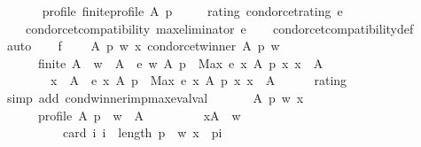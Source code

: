 \begin{isabellebody}
\ \ \isanewline
\ \ \ \ profile{\isacharcolon}{\kern0pt}\ {\isachardoublequoteopen}finite{\isacharunderscore}{\kern0pt}profile\ A\ p{\isachardoublequoteclose}\ \isanewline
\ \ \ \ rating{\isacharcolon}{\kern0pt}\ {\isachardoublequoteopen}condorcet{\isacharunderscore}{\kern0pt}rating\ e{\isachardoublequoteclose}\isanewline
\ \ \isanewline
\ \ \ \ {\isachardoublequoteopen}condorcet{\isacharunderscore}{\kern0pt}compatibility\ {\isacharparenleft}{\kern0pt}max{\isacharunderscore}{\kern0pt}eliminator\ e{\isacharparenright}{\kern0pt}{\isachardoublequoteclose}\isanewline
%
\isadelimproof
\ \ %
\endisadelimproof
%
\isatagproof
{}\isamarkupfalse%
\ condorcet{\isacharunderscore}{\kern0pt}compatibility{\isacharunderscore}{\kern0pt}def\isanewline
{}\isamarkupfalse%
\ {\isacharparenleft}{\kern0pt}auto{\isacharparenright}{\kern0pt}\isanewline
\ \ \isamarkupfalse%
\ f{}{\isacharcolon}{\kern0pt}\isanewline
\ \ \ \ {\isachardoublequoteopen}{\isasymAnd}A\ p\ w\ x{\isachardot}{\kern0pt}\ condorcet{\isacharunderscore}{\kern0pt}winner\ A\ p\ w\ {\isasymLongrightarrow}\isanewline
\ \ \ \ \ \ finite\ A\ {\isasymLongrightarrow}\ w\ {\isasymin}\ A\ {\isasymLongrightarrow}\ e\ w\ A\ p\ {\isacharless}{\kern0pt}\ Max\ {\isacharbraceleft}{\kern0pt}e\ x\ A\ p\ {\isacharbar}{\kern0pt}x{\isachardot}{\kern0pt}\ x\ {\isasymin}\ A{\isacharbraceright}{\kern0pt}\ {\isasymLongrightarrow}\isanewline
\ \ \ \ \ \ \ \ x\ {\isasymin}\ A\ {\isasymLongrightarrow}\ e\ x\ A\ p\ {\isacharless}{\kern0pt}\ Max\ {\isacharbraceleft}{\kern0pt}e\ x\ A\ p\ {\isacharbar}{\kern0pt}x{\isachardot}{\kern0pt}\ x\ {\isasymin}\ A{\isacharbraceright}{\kern0pt}{\isachardoublequoteclose}\isanewline
\ \ \ \ \isamarkupfalse%
\ rating\isanewline
\ \ \ \ \isamarkupfalse%
\ {\isacharparenleft}{\kern0pt}simp\ add{\isacharcolon}{\kern0pt}\ cond{\isacharunderscore}{\kern0pt}winner{\isacharunderscore}{\kern0pt}imp{\isacharunderscore}{\kern0pt}max{\isacharunderscore}{\kern0pt}eval{\isacharunderscore}{\kern0pt}val{\isacharparenright}{\kern0pt}\isanewline
\ \ \isamarkupfalse%
\isanewline
\ \ \ \ {\isachardoublequoteopen}{\isasymAnd}A\ p\ w\ x{\isachardot}{\kern0pt}\isanewline
\ \ \ \ \ \ profile\ A\ p\ {\isasymLongrightarrow}\ w\ {\isasymin}\ A\ {\isasymLongrightarrow}\isanewline
\ \ \ \ \ \ \ \ {\isasymforall}x{\isasymin}A\ {\isacharminus}{\kern0pt}\ {\isacharbraceleft}{\kern0pt}w{\isacharbraceright}{\kern0pt}{\isachardot}{\kern0pt}\isanewline
\ \ \ \ \ \ \ \ \ \ card\ {\isacharbraceleft}{\kern0pt}i{\isachardot}{\kern0pt}\ i\ {\isacharless}{\kern0pt}\ length\ p\ {\isasymand}\ {\isacharparenleft}{\kern0pt}w{\isacharcomma}{\kern0pt}\ x{\isacharparenright}{\kern0pt}\ {\isasymin}\ {\isacharparenleft}{\kern0pt}p{\isacharbang}{\kern0pt}i{\isacharparenright}{\kern0pt}{\isacharbraceright}{\kern0pt}\ {\isacharless}{\kern0pt}\isanewline

\end{isabellebody}
